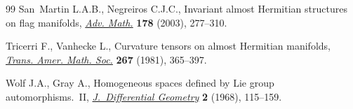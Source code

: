 \documentclass[pdftex]{sigma}%
\numberwithin{equation}{section}
\begin{document}
\begin{thebibliography}{99}
San~Martin L.A.B., Negreiros C.J.C., Invariant almost {H}ermitian structures on
 flag manifolds, \href{https://doi.org/10.1016/S0001-8708(02)00073-7}{\textit{Adv. Math.}} \textbf{178} (2003), 277--310.

Tricerri F., Vanhecke L., Curvature tensors on almost {H}ermitian manifolds,
 \href{https://doi.org/10.2307/1998660}{\textit{Trans. Amer. Math. Soc.}} \textbf{267} (1981), 365--397.

Wolf J.A., Gray A., Homogeneous spaces defined by {L}ie group
 automorphisms.~{II}, \href{https://doi.org/10.4310/jdg/1214428252}{\textit{J.~Differential Geometry}} \textbf{2} (1968),
 115--159.

\end{thebibliography}\LastPageEnding
\end{document}
